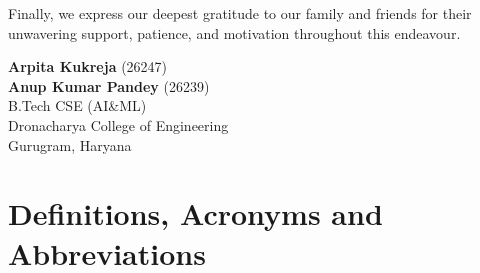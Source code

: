 \documentclass[12pt,a4paper,oneside]{report}
\begin{document}
Finally, we express our deepest gratitude to our family and friends for their unwavering support, patience, and motivation throughout this endeavour.

\vspace{2cm}

\begin{flushright}
\textbf{Arpita Kukreja} (26247)\\
\textbf{Anup Kumar Pandey} (26239)\\
B.Tech CSE (AI\&ML)\\
Dronacharya College of Engineering\\
Gurugram, Haryana
\end{flushright}

\clearpage



\listoffigures
{}
\clearpage

\listoftables
{}
\clearpage


\chapter*{Definitions, Acronyms and Abbreviations}
\end{document}
